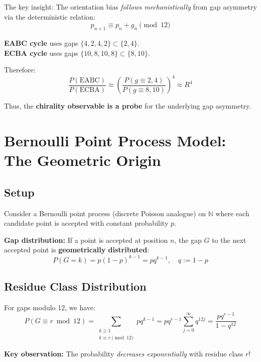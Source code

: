 \documentclass[11pt,a4paper]{article}
\theoremstyle{definition}
\theoremstyle{remark}
\begin{document}
The key insight: The orientation bias \emph{follows mechanistically} from gap asymmetry via the deterministic relation:
\begin{equation}
p_{n+1} \equiv p_n + g_n \pmod{12}
\end{equation}

\textbf{EABC cycle} uses gaps $\{4, 2, 4, 2\} \subset \{2, 4\}$.\\
\textbf{ECBA cycle} uses gaps $\{10, 8, 10, 8\} \subset \{8, 10\}$.

Therefore:
\begin{equation}
\frac{P(\text{EABC})}{P(\text{ECBA})} \approx \left(\frac{P(g \equiv 2,4)}{P(g \equiv 8,10)}\right)^4 \approx R^4
\end{equation}

Thus, the \textbf{chirality observable is a probe} for the underlying gap asymmetry.

\section{Bernoulli Point Process Model: The Geometric Origin}

\subsection{Setup}

Consider a Bernoulli point process (discrete Poisson analogue) on $\mathbb{N}$ where each candidate point is accepted with constant probability $p$.

\textbf{Gap distribution:} If a point is accepted at position $n$, the gap $G$ to the next accepted point is \textbf{geometrically distributed}:
\begin{equation}
P(G = k) = p(1-p)^{k-1} = p q^{k-1}, \quad q := 1-p
\end{equation}

\subsection{Residue Class Distribution}

For gaps modulo 12, we have:
\begin{equation}
P(G \equiv r \bmod 12) = \sum_{\substack{k \geq 1 \\ k \equiv r \pmod{12}}} p q^{k-1}
= p q^{r-1} \sum_{j=0}^{\infty} q^{12j}
= \frac{p q^{r-1}}{1 - q^{12}}
\end{equation}

\textbf{Key observation:} The probability \emph{decreases exponentially} with residue class $r$!
\end{document}
